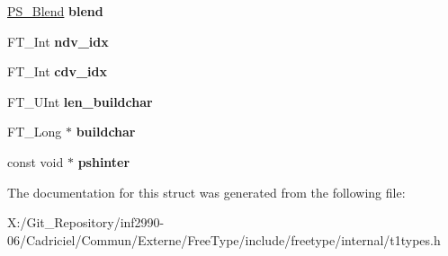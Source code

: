 \begin{DoxyCompactItemize}
\item 
\hypertarget{struct_t1___face_rec___a51e4e76f9988ec601d1fec6b5d4611db}{\hyperlink{struct_p_s___blend_rec__}{P\-S\-\_\-\-Blend} {\bfseries blend}}\label{struct_t1___face_rec___a51e4e76f9988ec601d1fec6b5d4611db}

\item 
\hypertarget{struct_t1___face_rec___a0ecadea7618642ccc351f81ac56ec266}{F\-T\-\_\-\-Int {\bfseries ndv\-\_\-idx}}\label{struct_t1___face_rec___a0ecadea7618642ccc351f81ac56ec266}

\item 
\hypertarget{struct_t1___face_rec___a7a77dcddf65ac6d86f1f62b3859d11d8}{F\-T\-\_\-\-Int {\bfseries cdv\-\_\-idx}}\label{struct_t1___face_rec___a7a77dcddf65ac6d86f1f62b3859d11d8}

\item 
\hypertarget{struct_t1___face_rec___a75554021d0baddb1c64f69fd8dbde86b}{F\-T\-\_\-\-U\-Int {\bfseries len\-\_\-buildchar}}\label{struct_t1___face_rec___a75554021d0baddb1c64f69fd8dbde86b}

\item 
\hypertarget{struct_t1___face_rec___af1fd890acaa0f423f7cc36807c42d75f}{F\-T\-\_\-\-Long $\ast$ {\bfseries buildchar}}\label{struct_t1___face_rec___af1fd890acaa0f423f7cc36807c42d75f}

\item 
\hypertarget{struct_t1___face_rec___a438e8ce8cbd53b7e205b17f95e7b2106}{const void $\ast$ {\bfseries pshinter}}\label{struct_t1___face_rec___a438e8ce8cbd53b7e205b17f95e7b2106}

\end{DoxyCompactItemize}


The documentation for this struct was generated from the following file\-:\begin{DoxyCompactItemize}
\item 
X\-:/\-Git\-\_\-\-Repository/inf2990-\/06/\-Cadriciel/\-Commun/\-Externe/\-Free\-Type/include/freetype/internal/t1types.\-h\end{DoxyCompactItemize}
